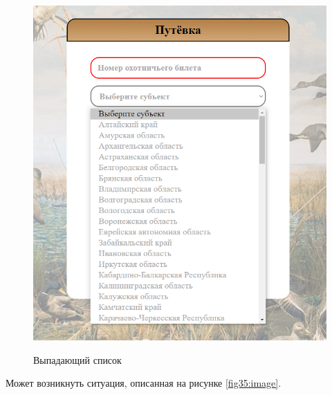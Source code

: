 	\begin{figure}[h!]
		\centering
		\begin{center}
			{\includegraphics[scale=0.5]{schemes/screens/scroll_menu.png}}
			\caption{Выпадающий список}
			\label{fig34:image}
		\end{center}
	\end{figure}

	Может возникнуть ситуация, описанная на рисунке \ref{fig35:image}. 
		
